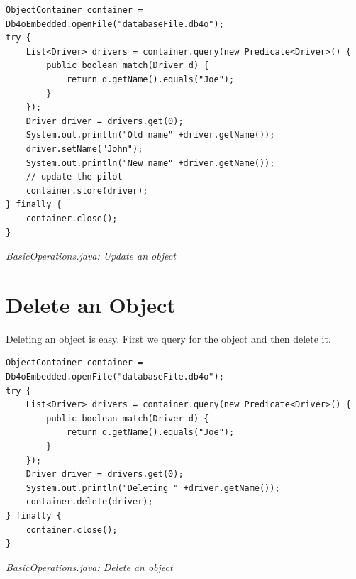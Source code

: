 \begin{lstlisting}
ObjectContainer container = Db4oEmbedded.openFile("databaseFile.db4o");
try {
    List<Driver> drivers = container.query(new Predicate<Driver>() {
        public boolean match(Driver d) {
            return d.getName().equals("Joe");
        }
    });
    Driver driver = drivers.get(0);
    System.out.println("Old name" +driver.getName());
    driver.setName("John");
    System.out.println("New name" +driver.getName());
    // update the pilot
    container.store(driver);
} finally {
    container.close();
}
\end{lstlisting}

{\small\itshape BasicOperations.java: Update an object\par}
\medskip

\section{Delete an Object}
\label{tut:basics:deleteobject}

Deleting an object is easy. First we query for the object and then delete it.

\begin{lstlisting}
ObjectContainer container = Db4oEmbedded.openFile("databaseFile.db4o");
try {
    List<Driver> drivers = container.query(new Predicate<Driver>() {
        public boolean match(Driver d) {
            return d.getName().equals("Joe");
        }
    });
    Driver driver = drivers.get(0);
    System.out.println("Deleting " +driver.getName());
    container.delete(driver);
} finally {
    container.close();
}
\end{lstlisting}

{\small\itshape BasicOperations.java: Delete an object\par}
\medskip

